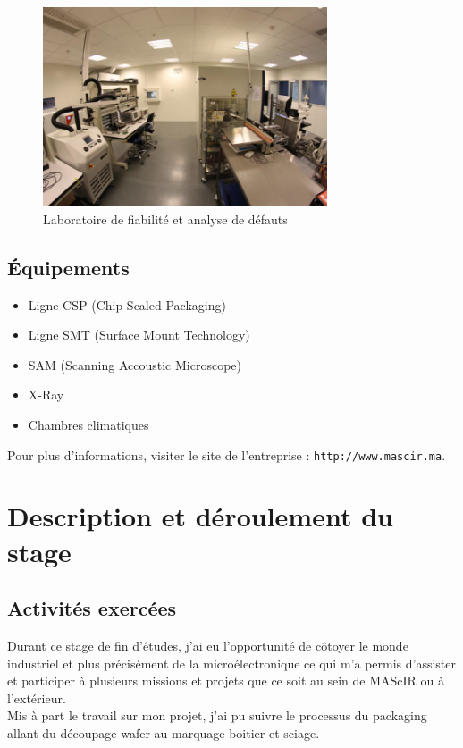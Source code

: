 \documentclass[11pt, a4paper, twoside]{book}
\begin{document}
\begin{figure}[h!]
\centering
\includegraphics[width=0.75\textwidth]{labo}
\caption{Laboratoire de fiabilité et analyse de défauts}
\end{figure}

\subsection{Équipements}
\begin{itemize}
\item Ligne CSP (Chip Scaled Packaging)
\item Ligne SMT (Surface Mount Technology)
\item SAM (Scanning Accoustic Microscope)
\item X-Ray
\item Chambres climatiques
\end{itemize}

Pour plus d'informations, visiter le site de l'entreprise : \texttt{http://www.mascir.ma}.

\section{Description et déroulement du stage}
\subsection{Activités exercées}
Durant ce stage de fin d’études, j’ai eu l’opportunité de côtoyer le monde industriel et plus précisément de la microélectronique ce qui m’a permis d’assister et participer à plusieurs missions et projets que ce soit au sein de MAScIR ou à l’extérieur.\\

Mis à part le travail sur mon projet, j’ai pu suivre le processus du packaging allant du découpage wafer au marquage boitier et sciage.\\
\end{document}
